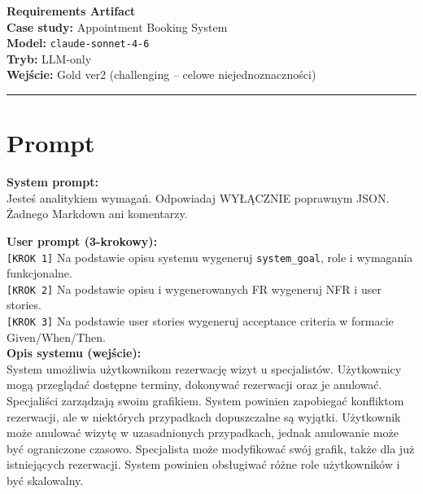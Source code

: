 \documentclass[12pt,a4paper]{article}
\begin{document}
\begin{center}
  {\LARGE\bfseries Requirements Artifact}\\[1.5em]
  {\large \textbf{Case study:} Appointment Booking System}\\[0.3em]
  {\large \textbf{Model:} \texttt{claude-sonnet-4-6}}\\[0.3em]
  {\large \textbf{Tryb:} LLM-only}\\[0.3em]
  {\large \textbf{Wejście:} Gold ver2 (challenging -- celowe niejednoznaczności)}
\end{center}

\vspace{1em}\hrule\vspace{1.5em}

\section{Prompt}

\begin{mdframed}[backgroundcolor=metabg, linewidth=0pt, innerleftmargin=10pt, innerrightmargin=10pt, innertopmargin=8pt, innerbottommargin=8pt]
\textbf{System prompt:}\\
\small Jesteś analitykiem wymagań. Odpowiadaj WYŁĄCZNIE poprawnym JSON. Żadnego Markdown ani komentarzy.
\end{mdframed}

\vspace{0.5em}
\begin{mdframed}[backgroundcolor=promptbg, linewidth=0pt, innerleftmargin=10pt, innerrightmargin=10pt, innertopmargin=8pt, innerbottommargin=8pt]
\textbf{User prompt (3-krokowy):}\\[0.3em]
\small
\texttt{[KROK 1]} Na podstawie opisu systemu wygeneruj \texttt{system\_goal}, role i wymagania funkcjonalne.\\
\texttt{[KROK 2]} Na podstawie opisu i wygenerowanych FR wygeneruj NFR i user stories.\\
\texttt{[KROK 3]} Na podstawie user stories wygeneruj acceptance criteria w formacie Given/When/Then.\\[0.3em]
\textbf{Opis systemu (wejście):}\\
System umożliwia użytkownikom rezerwację wizyt u specjalistów. Użytkownicy mogą przeglądać dostępne terminy, dokonywać rezerwacji oraz je anulować. Specjaliści zarządzają swoim grafikiem. System powinien zapobiegać konfliktom rezerwacji, ale w niektórych przypadkach dopuszczalne są wyjątki. Użytkownik może anulować wizytę w uzasadnionych przypadkach, jednak anulowanie może być ograniczone czasowo. Specjalista może modyfikować swój grafik, także dla już istniejących rezerwacji. System powinien obsługiwać różne role użytkowników i być skalowalny.
\end{mdframed}
\end{document}
